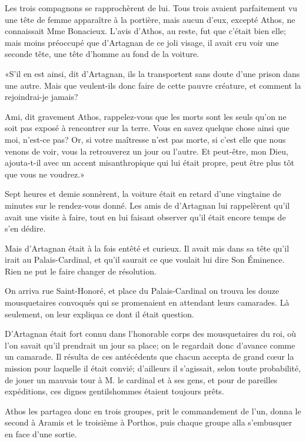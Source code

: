 Les trois compagnons se rapprochèrent de lui. Tous trois avaient parfaitement vu une tête de femme apparaître à la portière, mais aucun d'eux, excepté Athos, ne connaissait Mme Bonacieux. L'avis d'Athos, au reste, fut que c'était bien elle; mais moins préoccupé que d'Artagnan de ce joli visage, il avait cru voir une seconde tête, une tête d'homme au fond de la voiture. 

«S'il en est ainsi, dit d'Artagnan, ils la transportent sans doute d'une prison dans une autre. Mais que veulent-ils donc faire de cette pauvre créature, et comment la rejoindrai-je jamais? 

\speak  Ami, dit gravement Athos, rappelez-vous que les morts sont les seuls qu'on ne soit pas exposé à rencontrer sur la terre. Vous en savez quelque chose ainsi que moi, n'est-ce pas? Or, si votre maîtresse n'est pas morte, si c'est elle que nous venons de voir, vous la retrouverez un jour ou l'autre. Et peut-être, mon Dieu, ajouta-t-il avec un accent misanthropique qui lui était propre, peut être plus tôt que vous ne voudrez.» 

Sept heures et demie sonnèrent, la voiture était en retard d'une vingtaine de minutes sur le rendez-vous donné. Les amis de d'Artagnan lui rappelèrent qu'il avait une visite à faire, tout en lui faisant observer qu'il était encore temps de s'en dédire. 

Mais d'Artagnan était à la fois entêté et curieux. Il avait mis dans sa tête qu'il irait au Palais-Cardinal, et qu'il saurait ce que voulait lui dire Son Éminence. Rien ne put le faire changer de résolution. 

On arriva rue Saint-Honoré, et place du Palais-Cardinal on trouva les douze mousquetaires convoqués qui se promenaient en attendant leurs camarades. Là seulement, on leur expliqua ce dont il était question. 

D'Artagnan était fort connu dans l'honorable corps des mousquetaires du roi, où l'on savait qu'il prendrait un jour sa place; on le regardait donc d'avance comme un camarade. Il résulta de ces antécédents que chacun accepta de grand cœur la mission pour laquelle il était convié; d'ailleurs il s'agissait, selon toute probabilité, de jouer un mauvais tour à M. le cardinal et à ses gens, et pour de pareilles expéditions, ces dignes gentilshommes étaient toujours prêts. 

Athos les partagea donc en trois groupes, prit le commandement de l'un, donna le second à Aramis et le troisième à Porthos, puis chaque groupe alla s'embusquer en face d'une sortie. 

